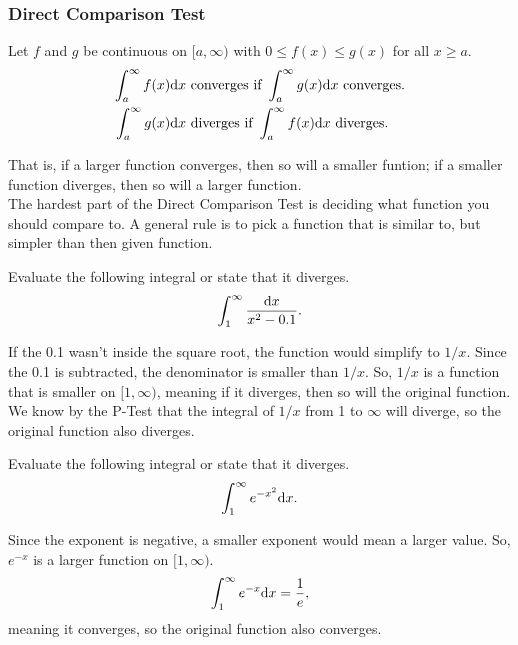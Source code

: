\subsubsection{Direct Comparison Test}
\begin{lemma}
	Let $f$ and $g$ be continuous on $[a,\infty)$ with $0 \leq f(x) \leq g(x)$ for all $x \geq a$.
	\begin{align*}
		\int_{a}^{\infty}{f(x)\mathrm{d} x} &\text{ converges if } \int_{a}^{\infty}{g(x)\mathrm{d} x} \text{ converges.} \\
		\int_{a}^{\infty}{g(x)\mathrm{d} x} &\text{ diverges if } \int_{a}^{\infty}{f(x)\mathrm{d} x} \text{ diverges.}
	\end{align*}
\end{lemma}
\noindent
That is, if a larger function converges, then so will a smaller funtion; if a smaller function diverges, then so will a larger function. \\

\noindent
The hardest part of the Direct Comparison Test is deciding what function you should compare to.
A general rule is to pick a function that is similar to, but simpler than then given function.

\begin{example}
	Evaluate the following integral or state that it diverges.
	\begin{equation*}
		\int_{1}^{\infty}{\frac{\mathrm{d} x}{x^2-0.1}}.
	\end{equation*}
\end{example}
If the 0.1 wasn't inside the square root, the function would simplify to $1/x$.
Since the 0.1 is subtracted, the denominator is smaller than $1/x$.
So, $1/x$ is a function that is smaller on $[1,\infty)$, meaning if it diverges, then so will the original function.
We know by the P-Test that the integral of $1/x$ from 1 to $\infty$ will diverge, so the original function also diverges.

\begin{example}
	Evaluate the following integral or state that it diverges.
	\begin{equation*}
		\int_{1}^{\infty}{e^{-x^2}\mathrm{d} x}.
	\end{equation*}
\end{example}
Since the exponent is negative, a smaller exponent would mean a larger value.
So, $e^{-x}$ is a larger function on $[1,\infty)$.
\begin{equation*}
	\int_{1}^{\infty}{e^{-x}\mathrm{d} x} = \frac{1}{e},
\end{equation*}
meaning it converges, so the original function also converges.

